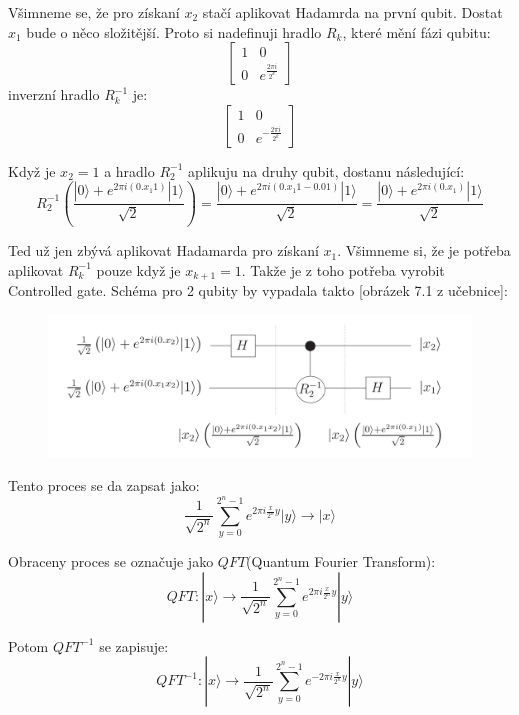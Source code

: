 \documentclass[11pt]{article}
\begin{document}
\par Všimneme se, že pro získaní $x_2$ stačí aplikovat Hadamrda na první qubit.
Dostat $x_1$ bude o něco složitější.
Proto si nadefinuji hradlo $R_k$, které mění fázi qubitu:
$$
    \begin{bmatrix}
        1 & 0                       \\
        0 & e^{\frac{2 \pi i}{2^k}}
    \end{bmatrix}
$$
inverzní hradlo $R_k^{-1}$ je:
$$
    \begin{bmatrix}
        1 & 0                        \\
        0 & e^{-\frac{2 \pi i}{2^k}}
    \end{bmatrix}
$$
\par Když je $x_2 = 1$ a hradlo $R_2^{-1}$ aplikuju na druhy qubit, dostanu následující:
$$
    R_2^{-1}\left(\frac{|0\rangle + e^{2\pi i (0.x_1 1)}|1\rangle}{\sqrt{2}}\right) =
    \frac{|0\rangle + e^{2\pi i (0.x_1 1 - 0.01)}|1\rangle}{\sqrt{2}} =
    \frac{|0\rangle + e^{2\pi i (0.x_1)}|1\rangle}{\sqrt{2}}
$$
\par Ted už jen zbývá aplikovat Hadamarda pro získaní $x_1$.
Všimneme si, že je potřeba aplikovat $R_k^{-1}$ pouze když je $x_{k + 1} = 1$.
Takže je z toho potřeba vyrobit Controlled gate.
Schéma pro 2 qubity by vypadala takto
    [obrázek 7.1 z učebnice]:
\begin{figure}[H]
    \includegraphics[scale=.6]{phase_estimation}
    \centering
\end{figure}
\par Tento proces se da zapsat jako:
$$\frac{1}{\sqrt{2^n}}\displaystyle\sum_{y=0}^{2^n - 1} e^{2\pi i \frac{x}{2^n} y}|y\rangle \to |x\rangle$$
\par Obraceny proces se označuje jako $QFT$(Quantum Fourier Transform):
$$QFT:|x\rangle \to \frac{1}{\sqrt{2^n}}\displaystyle\sum_{y=0}^{2^n - 1} e^{2\pi i \frac{x}{2^n} y}|y\rangle$$
\par Potom $QFT^{-1}$ se zapisuje:
$$QFT^{-1}:|x\rangle \to \frac{1}{\sqrt{2^n}}\displaystyle\sum_{y=0}^{2^n - 1} e^{-2\pi i \frac{x}{2^n} y}|y\rangle$$
\end{document}

